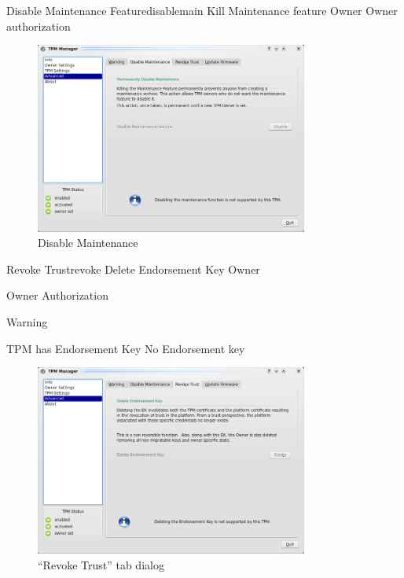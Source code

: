 \documentclass[
  american        %
]{sirrixreport}
\begin{document}
\begin{usecase}{Disable Maintenance Feature}{disablemain}
\ucdesc Kill Maintenance feature
\ucactors Owner
\ucinclude Owner authorization
\end{usecase}

\begin{figure}[h]
 \centering
 \includegraphics[width=0.8\textwidth]{images/tpm_killmaintenance}
 \caption{Disable Maintenance }
\end{figure}
\clearpage

\begin{usecase}{Revoke Trust}{revoke}
\ucdesc Delete Endorsement Key
\ucactors  Owner
\ucinclude 
   \begin{compactitem}
      \item Owner Authorization 
      \item Warning 
   \end{compactitem}
\ucprecond TPM has Endorsement Key
\ucpostcond No Endorsement key
\end{usecase}

\begin{figure}[h]
 \centering
 \includegraphics[width=0.8\textwidth]{images/tpm_revokeek}
 \caption{``Revoke Trust'' tab dialog }
\end{figure}
\clearpage
\end{document}
